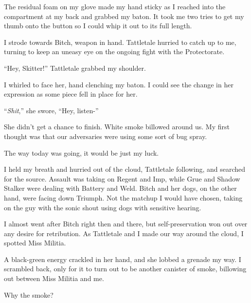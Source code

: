 





The residual foam on my glove made my hand sticky as I reached into the compartment at my back and grabbed my baton.  It took me two tries to get my thumb onto the button so I could whip it out to its full length.



I strode towards Bitch, weapon in hand.  Tattletale hurried to catch up to me, turning to keep an uneasy eye on the ongoing fight with the Protectorate.



``Hey, Skitter!'' Tattletale grabbed my shoulder.



I whirled to face her, hand clenching my baton.  I could see the change in her expression as some piece fell in place for her.



``\emph{Shit},'' she swore, ``Hey, listen-''



She didn't get a chance to finish.  White smoke billowed around us.  My first thought was that our adversaries were using some sort of bug spray.



The way today was going, it would be just my luck.



I held my breath and hurried out of the cloud, Tattletale following, and searched for the source.  Assault was taking on Regent and Imp, while Grue and Shadow Stalker were dealing with Battery and Weld.  Bitch and her dogs, on the other hand, were facing down Triumph.  Not the matchup I would have chosen, taking on the guy with the sonic shout using dogs with sensitive hearing.



I almost went after Bitch right then and there, but self-preservation won out over any desire for retribution.  As Tattletale and I made our way around the cloud, I spotted Miss Militia.



A black-green energy crackled in her hand, and she lobbed a grenade my way.  I scrambled back, only for it to turn out to be another canister of smoke, billowing out between Miss Militia and me.



Why the smoke?



